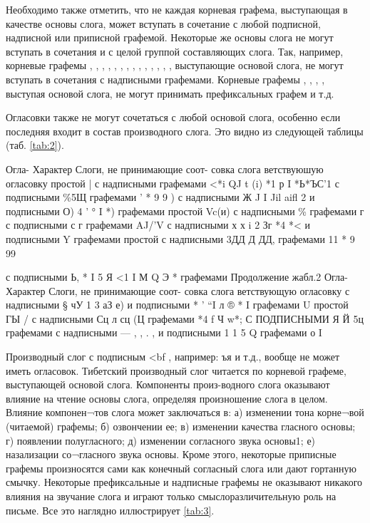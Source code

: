 Необходимо также отметить, что не каждая корневая графема, выступающая в качестве основы слога, может вступать в сочетание с любой подписной, надписной или приписной графемой. Некоторые же основы слога не могут вступать в сочетания и с целой группой составляющих слога. Так, например, корневые графемы , , , , , , , , , , , , , , выступающие основой слога, не могут вступать в сочетания с надписными графемами. Корневые графемы , , , , выступая основой слога, не могут принимать префиксальных графем и т.д.

Огласовки также не могут сочетаться с любой основой слога, особенно если последняя входит в состав производного слога. Это видно из следующей таблицы (таб. \ref{tab:2}). 

 
Огла- Характер Слоги, не принимающие соот- совка	слога	ветствуюшую огласовку
простой	|
с надписными графемами	<*i QJ t
  (i)	 *1 р I	*Ь*ЪС'1
с подписными \%5Щ графемами	'	*	9	9	)
с надписными Ж J   I Jil aifl 2 и подписными	О) 4 '	° I *)
графемами
простой
Vc(и)	с надписными 	\%
графемами	г
с подписными	с   г
графемами		AJ/’V
с надписными х х i 2 Зг 	 *4  *<
и подписными	 Y  
графемами
простой	 
с надписными	3ДД	Д ДД,
графемами	11	*	9	99

с подписными	Ь, * I	5 Я <1 I	М	Q	Э	*
графемами
Продолжение жабл.2
Огла- Характер Слоги, не принимающие соот- совка	слога	ветствующую огласовку
с надписными § чУ 	1   3  аЗ
е) и подписными *	' “I л 	® * I
графемами U простой ГЫ
/
с надписными	Сц л сц (Ц
графемами	*4 f Ч
w*;
С ПОДПИСНЫМИ Я Й 5ц
графемами
с надписными — ,	, . ,  	 
и подписными	 	1	1 5 Q
графемами	 о I   

Производный слог с подписным <bf , например: ъя и т.д., вообще не может иметь огласовок.
Тибетский производный слог читается по корневой графеме, выступающей основой слога. Компоненты произ-водного слога оказывают влияние на чтение основы слога, определяя произношение слога в целом. Влияние компонен¬тов слога может заключаться в: а) изменении тона корне¬вой (читаемой) графемы; б) озвончении ее; в) изменении качества гласного основы; г) появлении полугласного; д) изменении согласного звука основы1; е) назализации со¬гласного звука основы. Кроме этого, некоторые приписные графемы произносятся сами как конечный согласный слога или дают гортанную смычку. Некоторые префиксальные и надписные графемы не оказывают никакого влияния на звучание слога и играют только смыслоразличительную роль на письме. Все это наглядно иллюстрирует \ref{tab:3}.

